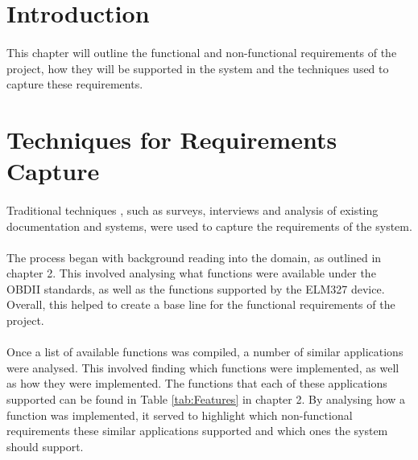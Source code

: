 \section{Introduction}
	\paragraph{}{
	This chapter will outline the functional and non-functional requirements of the project, how they will be supported in the system and the techniques used to capture these requirements.
	}		

\section{Techniques for Requirements Capture}	
	\paragraph{}{
	Traditional techniques \cite{ReqEng}, such as surveys, interviews and analysis of existing documentation and systems, were used to capture the requirements of the system.
	}
	\paragraph{}{
	The process began with background reading into the domain, as outlined in chapter 2. This involved analysing what functions were available under the OBDII standards, as well as the functions supported by the ELM327 device. Overall, this helped to create a base line for the functional requirements of the project.
	}	
	\paragraph{}{
	Once a list of available functions was compiled, a number of similar applications were analysed. This involved finding which functions were implemented, as well as how they were implemented. The functions that each of these applications supported can be found in Table \ref{tab:Features} in chapter 2. By analysing how a function was implemented, it served to highlight which non-functional requirements these similar applications supported and which ones the system should support.
	}
